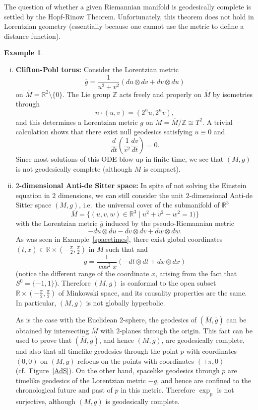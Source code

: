 \documentclass[10pt]{amsart}
\newcommand{\bbR}{\mathbb{R}}      %
\newcommand{\bbZ}{\mathbb{Z}}      %
\theoremstyle{definition}
\newtheorem{Example}[Thm]{Example}
\theoremstyle{remark}
\begin{document}
The question of whether a given Riemannian manifold is geodesically complete is settled by the Hopf-Rinow Theorem. Unfortunately, this theorem does not hold in Lorentzian geometry (essentially because one cannot use the metric to define a distance function). 

\begin{Example} \hspace{1cm} \label{Hopf-Rinow}
\begin{enumerate}[(i)]
\item {\bf Clifton-Pohl torus:} Consider the Lorentzian metric
\[
\overline{g} = \frac1{u^2 + v^2} (du \otimes dv + dv \otimes du)
\]
on $\overline{M}=\bbR^2 \setminus \{ 0 \}$. The Lie group $\bbZ$ acts freely and properly on $\overline{M}$ by isometries through 
\[
n \cdot (u,v) = (2^n u, 2^n v),
\]
and this determines a Lorentzian metric $g$ on $M = \overline{M} / \bbZ \cong T^2$. A trivial calculation shows that there exist null geodesics satisfying $u \equiv 0$ and
\[
\frac{d}{dt}\left( \frac1{v^2} \frac{dv}{dt}\right) = 0.
\]
Since most solutions of this ODE blow up in finite time, we see that $(M,g)$ is not geodesically complete (although $M$ is compact).
\item \label{2dAdS} {\bf $2$-dimensional Anti-de Sitter space:} In spite of not solving the Einstein equation in $2$ dimensions, we can still consider the unit $2$-dimensional Anti-de Sitter space $(M,g)$, i.e.~the universal cover of the submanifold of $\bbR^3$
\[
\overline{M} = \{(u,v,w)\in \bbR^3 \mid u^2+v^2-w^2 = 1 )\}
\]
with the Lorentzian metric $\overline{g}$ induced by the pseudo-Riemannian metric
\[
- du\otimes du - dv\otimes dv + dw\otimes dw.
\]
As was seen in Example~\ref{spacetimes}, there exist global coordinates $(t,x) \in \bbR \times (-\frac\pi2, \frac\pi2)$ in $M$ such that and 
\[
g = \frac1{\cos^2 x} (- dt \otimes dt + dx \otimes dx)
\]
(notice the different range of the coordinate $x$, arising from the fact that $S^0=\{-1,1\}$). Therefore $(M,g)$ is conformal to the open subset $\bbR \times (-\frac\pi2, \frac\pi2)$ of Minkowski space, and its causality properties are the same. In particular, $(M,g)$ is not globally hyperbolic.

As is the case with the Euclidean $2$-sphere, the geodesics of $(\overline{M},\overline{g})$ can be obtained by intersecting $\overline{M}$ with $2$-planes through the origin. This fact can be used to prove that $(\overline{M},\overline{g})$, and hence $(M,g)$, are geodesically complete, and also that all timelike geodesics through the point $p$ with coordinates $(0,0)$ on $(M,g)$ refocus on the points with coordinates $(\pm \pi,0)$ (cf.~Figure~\ref{AdS}). On the other hand, spacelike geodesics through $p$ are timelike geodesics of the Lorentzian metric $-g$, and hence are confined to the chronological future and past of $p$ in this metric. Therefore $\exp_p$ is not surjective, although $(M,g)$ is geodesically complete.


\end{enumerate}
\end{Example}
\end{document}
